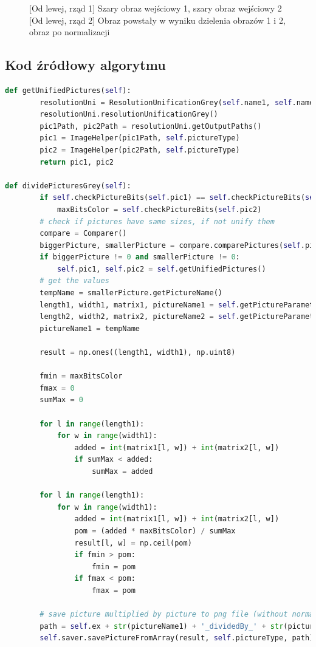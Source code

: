 \documentclass[a4paper,12pt, titlepage]{report}
\begin{document}
\begin{figure}[h]
    \caption{[Od lewej, rząd 1] Szary obraz wejściowy 1, szary obraz wejściowy 2 [Od lewej, rząd 2] Obraz powstały w wyniku dzielenia obrazów 1 i 2, obraz po normalizacji}%
    \label{fig:geo_after_grey1}%
\end{figure}
\FloatBarrier
\subsection*{Kod źródłowy algorytmu}
\begin{lstlisting}[language=Python]
def getUnifiedPictures(self):
        resolutionUni = ResolutionUnificationGrey(self.name1, self.name2)
        resolutionUni.resolutionUnificationGrey()
        pic1Path, pic2Path = resolutionUni.getOutputPaths()
        pic1 = ImageHelper(pic1Path, self.pictureType)
        pic2 = ImageHelper(pic2Path, self.pictureType)
        return pic1, pic2

def dividePicturesGrey(self):
        if self.checkPictureBits(self.pic1) == self.checkPictureBits(self.pic2):
            maxBitsColor = self.checkPictureBits(self.pic2)
        # check if pictures have same sizes, if not unify them
        compare = Comparer()
        biggerPicture, smallerPicture = compare.comparePictures(self.pic1, self.pic2)
        if biggerPicture != 0 and smallerPicture != 0:
            self.pic1, self.pic2 = self.getUnifiedPictures()
        # get the values
        tempName = smallerPicture.getPictureName()
        length1, width1, matrix1, pictureName1 = self.getPictureParameters(self.pic1)
        length2, width2, matrix2, pictureName2 = self.getPictureParameters(self.pic2)
        pictureName1 = tempName

        result = np.ones((length1, width1), np.uint8)

        fmin = maxBitsColor
        fmax = 0
        sumMax = 0

        for l in range(length1):
            for w in range(width1):
                added = int(matrix1[l, w]) + int(matrix2[l, w])
                if sumMax < added:
                    sumMax = added

        for l in range(length1):
            for w in range(width1):
                added = int(matrix1[l, w]) + int(matrix2[l, w])
                pom = (added * maxBitsColor) / sumMax
                result[l, w] = np.ceil(pom)
                if fmin > pom:
                    fmin = pom
                if fmax < pom:
                    fmax = pom

        # save picture multiplied by picture to png file (without normalization)
        path = self.ex + str(pictureName1) + '_dividedBy_' + str(pictureName2) + '.png'
        self.saver.savePictureFromArray(result, self.pictureType, path)


\end{lstlisting}
\end{document}
